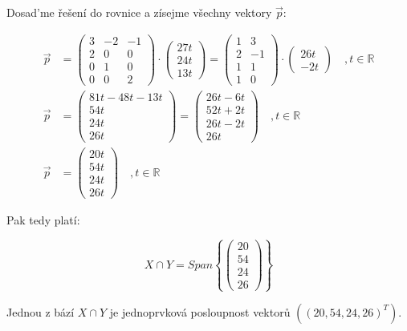 \documentclass[12pt]{article}
\begin{document}
\begin{enumerate}
  Dosad'me řešení do rovnice a zísejme všechny vektory $\vec{p}$:

  \begin{align*}
    \vec{p} &= \left(\begin{array}{ccc}
      3 & -2 & -1 \\
      2 & 0 & 0 \\
      0 & 1 & 0 \\
      0 & 0 & 2
    \end{array}\right) \cdot \left(\begin{array}{c}
      27t\\24t\\13t
    \end{array}\right)
    = \left(\begin{array}{ccc}
      1 & 3 \\
      2 & -1 \\
      1 & 1 \\
      1 & 0
    \end{array}\right) \cdot \left(\begin{array}{c}
      26t\\-2t
    \end{array}\right) \quad , t\in\mathbb{R} \\
    \vec{p} &= \left(\begin{array}{c}
      81t-48t-13t \\ 54t \\ 24t \\ 26t
    \end{array}\right)
    =  \left(\begin{array}{c}
      26t-6t \\ 52t + 2t \\ 26t-2t \\ 26t
    \end{array}\right) \quad , t\in\mathbb{R} \\
    \vec{p} &= \left(\begin{array}{c}
      20t \\ 54t \\ 24t \\ 26t
    \end{array}\right) \quad , t\in\mathbb{R}
  \end{align*}

  Pak tedy platí:

  \[
    X \cap Y = Span \left\{ \left(\begin{array}{c}
      20\\54\\24\\26
    \end{array}\right) \right\}
  \]

  Jednou z bází $X \cap Y$ je jednoprvková posloupnost vektorů $\left( (20,54,24,26)^T \right)$.

\end{enumerate}
\end{document}
